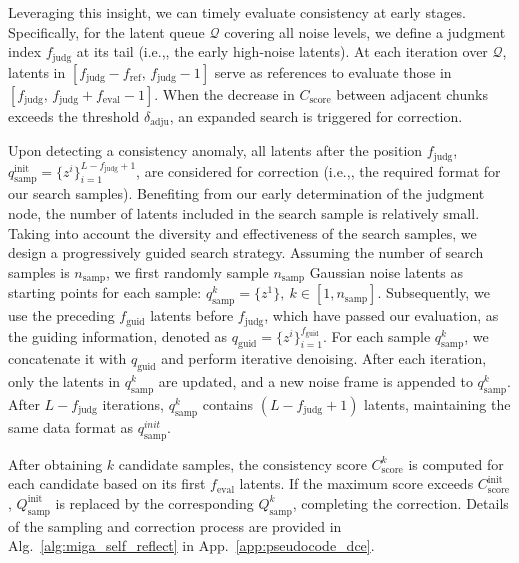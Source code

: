 \documentclass{llmxive}
\providecommand{\ie}{i.e.,\xspace}
\begin{document}
Leveraging this insight, we can timely evaluate consistency at early stages. Specifically, for the latent queue $\mathcal{Q}$ covering all noise levels, we define a judgment index $f_\mathrm{judg}$ at its tail (\ie, the early high-noise latents). At each iteration over $\mathcal{Q}$, latents in $[f_\mathrm{judg} - f_\mathrm{ref},\, f_\mathrm{judg} - 1]$ serve as references to evaluate those in $[f_\mathrm{judg},\, f_\mathrm{judg} + f_\mathrm{eval} - 1]$. 
When the decrease in $C_\mathrm{score}$ between adjacent chunks exceeds the threshold $\delta_{\mathrm{adju}}$, an expanded search is triggered for correction.

Upon detecting a consistency anomaly, all latents after the position $f_\mathrm{judg}$,  $q^{\mathrm{init}}_{\mathrm{samp}} = \{z^i\}_{i=1}^{L-f_\mathrm{judg}+1}$, are considered for correction (\ie, the required format for our search samples).
Benefiting from our early determination of the judgment node, the number of latents included in the search sample is relatively small.
Taking into account the diversity and effectiveness of the search samples, we design a progressively guided search strategy. 
Assuming the number of search samples is $n_\mathrm{samp}$, we first randomly sample $n_\mathrm{samp}$ Gaussian noise latents as starting points for each sample:
$q^{k}_{\mathrm{samp}} = \{z^{1}\},\ k \in [1, n_\mathrm{samp}]$.
Subsequently, we use the preceding $f_\mathrm{guid}$ latents before $f_\mathrm{judg}$, which have passed our evaluation, as the guiding information, denoted as $q_{\mathrm{guid}} = \{z^{i}\}_{i=1}^{f_\mathrm{guid}}$.
For each sample $q^{k}_{\mathrm{samp}}$, we concatenate it with $q_{\mathrm{guid}}$ and perform iterative denoising. 
After each iteration, only the latents in $q^{k}_{\mathrm{samp}}$ are updated, and a new noise frame is appended to $q^{k}_{\mathrm{samp}}$. 
After $L-f_\mathrm{judg}$ iterations, $q^{k}_{\mathrm{samp}}$ contains $(L-f_\mathrm{judg}+1)$ latents, 
maintaining the same data format as $q^{init}_{\mathrm{samp}}$.


After obtaining $k$ candidate samples, the consistency score $C_{\mathrm{score}}^{k}$ is computed for each candidate based on its first $f_{\mathrm{eval}}$ latents. 
If the maximum score exceeds $C_{\mathrm{score}}^{\mathrm{init}}$, $Q_{\mathrm{samp}}^{\mathrm{init}}$ is replaced by the corresponding $Q_{\mathrm{samp}}^{k}$, completing the correction. 
Details of the sampling and correction process are provided in Alg.~\ref{alg:miga_self_reflect} in App.~\ref{app:pseudocode_dce}.
\end{document}
